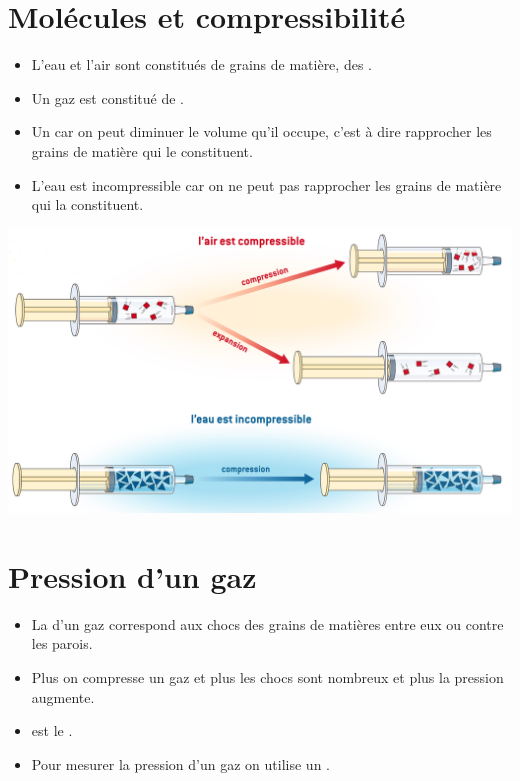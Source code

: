 \documentclass[12pt,a4paper]{article}
\begin{document}
	
	

\section{Molécules et compressibilité}


\begin{mybilan}
	\begin{itemize}
		\item L'eau et l'air sont constitués de grains de matière, des .
		\item Un gaz est constitué de .
		\item Un  car on peut diminuer le volume qu'il occupe, c'est à dire rapprocher les grains de matière qui le constituent.
		\item L'eau est incompressible car on ne peut pas rapprocher les grains de matière qui la constituent.
	\end{itemize}
\end{mybilan}



\begin{center}
	\includegraphics[scale=0.35]{img/compression}
\end{center}


\section{Pression d'un gaz}

\begin{mybilan}
	\begin{itemize}
		\item La  d'un gaz correspond aux chocs des grains de matières entre eux ou contre les parois.
		\item Plus on compresse un gaz et plus les chocs sont nombreux et plus la pression augmente.
		\item {} est le .
		\item Pour mesurer la pression d'un gaz on utilise un .
		
	\end{itemize}
\end{mybilan}
\end{document}

